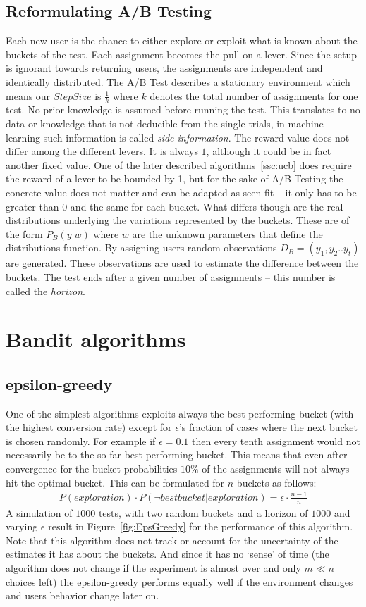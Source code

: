 \documentclass[main.tex]{subfiles}
\begin{document}
\subsection{Reformulating A/B Testing}
Each new user is the chance to either explore or exploit what is known about the buckets of the test. Each assignment becomes the pull on a lever. Since the setup is ignorant towards returning users, the assignments are independent and identically distributed. The A/B Test describes a stationary environment which means our $StepSize$ is $\frac{1}{k}$ where $k$ denotes the total number of assignments for one test. No prior knowledge is assumed before running the test. This translates to no data or knowledge that is not deducible from the single trials, in machine learning such information is called \emph{side information}. The reward value does not differ among the different levers. It is always $1$, although it could be in fact another fixed value. One of the later described algorithms~\ref{ssc:ucb} does require the reward of a lever to be bounded by 1, but for the sake of A/B Testing the concrete value does not matter and can be adapted as seen fit -- it only has to be greater than $0$ and the same for each bucket. What differs though are the real distributions underlying the variations represented by the buckets. These are of the form $P_B(y|w)$ where $w$ are the unknown parameters that define the distributions function. By assigning users random observations $D_B=(y_1,y_2..y_t)$ are generated. These observations are used to estimate the difference between the buckets. The test ends after a given number of assignments -- this number is called the \emph{horizon}.

\section{Bandit algorithms}
\subsection{epsilon-greedy}
One of the simplest algorithms exploits always the best performing bucket (with the highest conversion rate) except for $\epsilon $'s fraction of cases where the next bucket is chosen randomly. For example if $\epsilon = 0.1$ then every tenth assignment would not necessarily be to the so far best performing bucket. This means that even after convergence for the bucket probabilities $10\%$ of the assignments will not always hit the optimal bucket. This can be formulated for $n$ buckets as follows:
\begin{align*}
P(exploration) \cdot P(\neg best bucket | exploration) = \epsilon \cdot \frac{n-1}{n}
\end{align*}
A simulation of $1000$ tests, with two random buckets and a horizon of $1000$ and varying $\epsilon$ result in Figure~\ref{fig:EpsGreedy} for the performance of this algorithm. Note that this algorithm does not track or account for the uncertainty of the estimates it has about the buckets. And since it has no `sense' of time (the algorithm does not change if the experiment is almost over and only $m \ll n$ choices left) the epsilon-greedy performs equally well if the environment changes and users behavior change later on.
\end{document}
